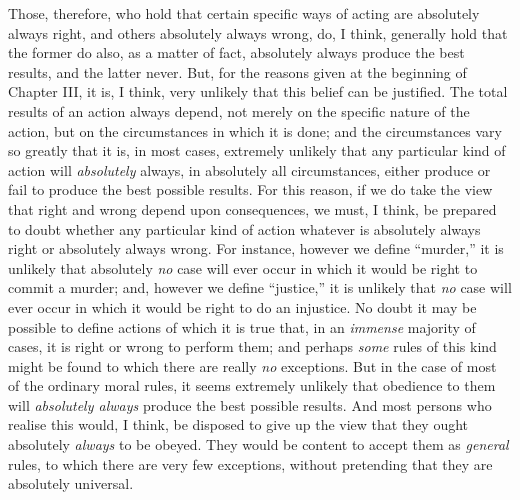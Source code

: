 Those, therefore, who hold that certain specific ways of acting are
absolutely always  right, and others absolutely always
wrong, do, I think, generally hold that the former do also, as a
matter of fact, absolutely always produce the best results, and the
latter never. But, for the reasons given at the beginning of Chapter
III, it is, I think, very unlikely that this belief can be justified.
The total results of an action always depend, not merely on the
specific nature of the action, but on the circumstances in which it is
done; and the circumstances vary so greatly that it is, in most cases,
extremely unlikely that any particular kind of action will
\textit{absolutely} always, in absolutely all circumstances, either
produce or fail to produce the best possible results. For this reason,
if we do take the view that right and wrong depend upon consequences,
we must, I think, be prepared to doubt whether any particular kind of
action whatever is absolutely always right or absolutely always wrong.
For instance, however we define ``murder,'' it is unlikely that
absolutely \textit{no} case will ever occur in which it would be right
to commit a murder; and, however we define ``justice,'' it is unlikely
that \textit{no} case will ever occur  in which it would be
right to do an injustice. No doubt it may be possible to define
actions of which it is true that, in an \textit{immense} majority of
cases, it is right or wrong to perform them; and perhaps \textit{some}
rules of this kind might be found to which there are really
\textit{no} exceptions. But in the case of most of the ordinary moral
rules, it seems extremely unlikely that obedience to them will
\textit{absolutely always} produce the best possible results. And most
persons who realise this would, I think, be disposed to give up the
view that they ought absolutely \textit{always} to be obeyed. They
would be content to accept them as \textit{general} rules, to which
there are very few exceptions, without pretending that they are
absolutely universal.

